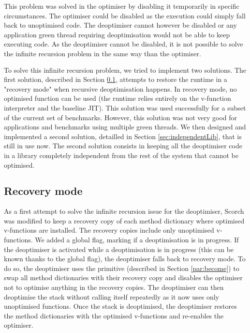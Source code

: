 \documentclass[a4paper,12pt,twoside]{../includes/ThesisStyle}
\begin{document}
This problem was solved in the optimiser by disabling it temporarily in specific circumstances. The optimiser could be disabled as the execution could simply fall back to unoptimised code. The deoptimiser cannot however be disabled or any application green thread requiring deoptimisation would not be able to keep executing code. As the deoptimiser cannot be disabled, it is not possible to solve the infinite recursion problem in the same way than the optimiser. 

To solve this infinite recursion problem, we tried to implement two solutions. The first solution, described in Section \ref{sec:recovery}, attempts to restore the runtime in a "recovery mode" when recursive deoptimisation happens. In recovery mode, no optimised function can be used (the runtime relies entirely on the v-function interpreter and the baseline JIT). This solution was used successfully for a subset of the current set of benchmarks. However, this solution was not very good for applications and benchmarks using multiple green threads. We then designed and implemented a second solution, detailled in Section \ref{sec:independentLib}, that is still in use now. The second solution consists in keeping all the deoptimiser code in a library completely independent from the rest of the system that cannot be optimised.

\subsection{Recovery mode}
\label{sec:recovery}

As a first attempt to solve the infinite recursion issue for the deoptimiser, Scorch was modified to keep a recovery copy of each method dictionary where optimised v-functions are installed. The recovery copies include only unoptimised v-functions. We added a global flag, marking if a deoptimisation is in progress. If the deoptimiser is activated while a deoptimisation is in progress (this can be known thanks to the global flag), the deoptimiser falls back to recovery mode. To do so, the deoptimiser uses the primitive  (described in Section \ref{par:become}) to swap all method dictionaries with their recovery copy and disables the optimiser not to optimise anything in the recovery copies. The deoptimiser can then deoptimise the stack without calling itself repeatedly as it now uses only unoptimised functions. Once the stack is deoptimised, the deoptimiser restores the method dictionaries with the optimised v-functions and re-enables the optimiser. 
\end{document}
